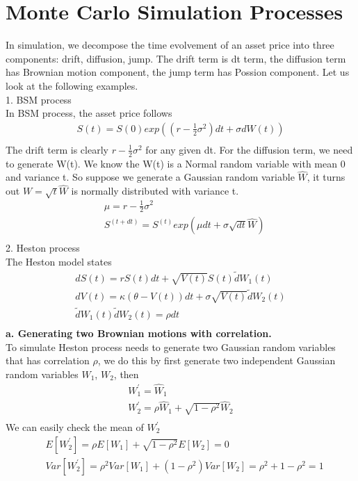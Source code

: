 \documentclass[a4paper]{article}
\begin{document}
\section{Monte Carlo Simulation Processes}
In simulation, we decompose the time evolvement of an asset price into three components: drift, diffusion, jump. The
drift term is dt term, the diffusion term has Brownian motion component, the jump term has Possion component. Let us look at the following examples. \\ 
1. BSM process\\
In BSM process, the asset price follows
\begin{align*}
	S(t) = S(0)exp((r - \frac{1}{2} \sigma^2 ) dt + \sigma dW(t)) \\
\end{align*}
The drift term is clearly $r - \frac{1}{2} \sigma^2$ for any given dt.  For the diffusion term, we need to generate W(t).
We know the W(t) is a Normal random variable with mean 0 and variance t. So suppose we generate a Gaussian random variable $\hat W$, it turns out $W = \sqrt{t} \hat W$ is normally distributed with variance t. 
\begin{align*}
	& \mu = r - \frac{1}{2} \sigma^2\\
	& S^{(t + dt)} = S^{(t)}exp(\mu dt + \sigma \sqrt{dt} \hat W) \\
\end{align*}
2. Heston process\\
The Heston model states
\begin{align*}
        dS(t) = rS(t)dt + \sqrt{V(t)} S(t) \tilde dW_1(t) \\
        dV(t) = \kappa (\theta - V(t))dt + \sigma \sqrt{V(t)} \tilde dW_2(t) \\
        \tilde dW_1(t) \tilde dW_2(t) = \rho dt \\
\end{align*}
{\bf a. Generating two Brownian motions with correlation. }\\
To simulate Heston process needs to generate two Gaussian random variables that has correlation $\rho$, we do this by first generate two independent Gaussian random variables $W_1$, $W_2$, then
\begin{align*}
	W_1^{'} = \hat W_1 \\
	W_2^{'} = \rho \hat W_1 + \sqrt{1 - \rho^2} \hat W_2 \\
\end{align*}
We can easily check the mean of $W_2^{'}$
\begin{align*}
	&E[W_2^{'}] = \rho E[W_1] + \sqrt{1 - \rho^2} E[W_2] = 0\\
	&Var[W_2^{'}] = \rho^2 Var[W_1] + (1 - \rho^2) Var[W_2] = \rho^2 + 1 - \rho^2 = 1 \\
\end{align*}
\end{document}
